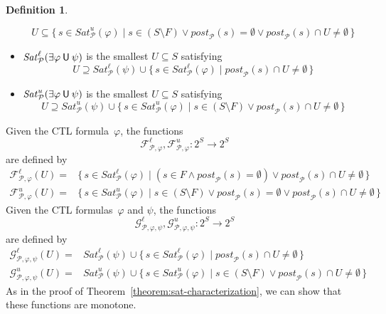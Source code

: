 \documentclass[12pt]{article}
\newcommand{\until}{\mathbin{\sf U}}
\theoremstyle{definition}
\newtheorem{definition}{Definition}
\begin{document}
\begin{definition}
\begin{itemize}
\[
U \subseteq \{\, s \in \mathit{Sat}^u_{\mathcal{P}}(\varphi) \mid s \in (S \setminus F) \vee \mathit{post}_{\mathcal{P}}(s) = \emptyset \vee \mathit{post}_{\mathcal{P}}(s) \cap U \not= \emptyset \,\}
\]
\item
$\mathit{Sat}^{\ell}_{\mathcal{P}}(\exists \varphi \until \psi)$ is the smallest $U \subseteq S$ satisfying
\[
U \supseteq \mathit{Sat}^{\ell}_{\mathcal{P}}(\psi) \cup \{\, s \in \mathit{Sat}^{\ell}_{\mathcal{P}}(\varphi) \mid  \mathit{post}_{\mathcal{P}}(s) \cap U \not= \emptyset \,\}
\]
\item
$\mathit{Sat}^u_{\mathcal{P}}(\exists \varphi \until \psi)$ is the smallest $U \subseteq S$ satisfying
\[
U \supseteq \mathit{Sat}^u_{\mathcal{P}}(\psi) \cup \{\, s \in \mathit{Sat}^u_{\mathcal{P}}(\varphi) \mid s \in (S \setminus F) \vee \mathit{post}_{\mathcal{P}}(s) \cap U \not= \emptyset \,\}
\]
\end{itemize}
\end{definition}

Given the CTL formula~$\varphi$, the functions
\[
\mathcal{F}^{\ell}_{\mathcal{P}, \varphi}, \mathcal{F}^{u}_{\mathcal{P}, \varphi} : 2^S \to 2^S
\]
are defined by
\begin{align*}
\mathcal{F}^{\ell}_{\mathcal{P}, \varphi}(U) 
= & \{\, s \in \mathit{Sat}^{\ell}_{\mathcal{P}}(\varphi) \mid (s \in F \wedge \mathit{post}_{\mathcal{P}}(s) = \emptyset) \vee \mathit{post}_{\mathcal{P}}(s) \cap U \not= \emptyset \,\}\\
\mathcal{F}^{u}_{\mathcal{P}, \varphi}(U) 
= & \{\, s \in \mathit{Sat}^{u}_{\mathcal{P}}(\varphi) \mid s \in (S \setminus F) \vee \mathit{post}_{\mathcal{P}}(s) = \emptyset \vee \mathit{post}_{\mathcal{P}}(s) \cap U \not= \emptyset \,\}
\end{align*}
Given the CTL formulas~$\varphi$ and $\psi$, the functions
\[
\mathcal{G}^{\ell}_{\mathcal{P}, \varphi,\psi}, \mathcal{G}^u_{\mathcal{P}, \varphi,\psi} : 2^S \to 2^S
\]
are defined by
\begin{align*}
\mathcal{G}^{\ell}_{\mathcal{P}, \varphi,\psi}(U) 
= & \mathit{Sat}^{\ell}_{\mathcal{P}}(\psi) \cup \{\, s \in \mathit{Sat}^{\ell}_{\mathcal{P}}(\varphi) \mid \mathit{post}_{\mathcal{P}}(s) \cap U \not= \emptyset \,\}\\
\mathcal{G}^u_{\mathcal{P}, \varphi,\psi}(U) 
= & \mathit{Sat}^u_{\mathcal{P}}(\psi) \cup \{\, s \in \mathit{Sat}^u_{\mathcal{P}}(\varphi) \mid s \in (S \setminus F) \vee \mathit{post}_{\mathcal{P}}(s) \cap U \not= \emptyset \,\}
\end{align*}
As in the proof of Theorem~\ref{theorem:sat-characterization}, we can show that these functions are monotone.
\end{document}

